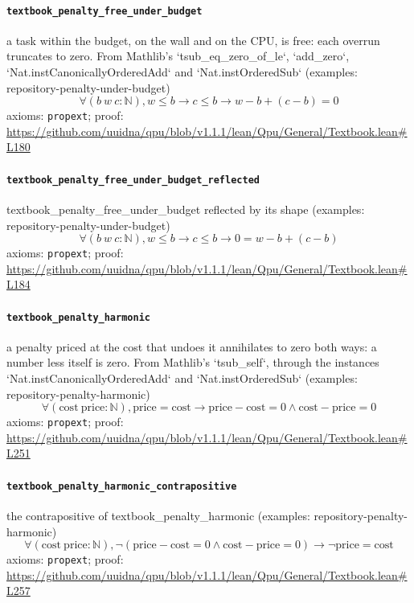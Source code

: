 \documentclass[11pt]{article}
\begin{document}
\paragraph{\texttt{textbook\_penalty\_free\_under\_budget}}
a task within the budget, on the wall and on the CPU, is free: each overrun truncates to zero. From Mathlib's `tsub\_eq\_zero\_of\_le`, `add\_zero`, `Nat.instCanonicallyOrderedAdd` and `Nat.instOrderedSub` (examples: repository-penalty-under-budget)
\[ \forall (b\ w\ c : \mathbb{N}), w \le b \to c \le b \to w - b + (c - b) = 0 \]
\noindent axioms: \texttt{propext}; proof: \url{https://github.com/uuidna/qpu/blob/v1.1.1/lean/Qpu/General/Textbook.lean\#L180}

\paragraph{\texttt{textbook\_penalty\_free\_under\_budget\_reflected}}
textbook\_penalty\_free\_under\_budget reflected by its shape (examples: repository-penalty-under-budget)
\[ \forall (b\ w\ c : \mathbb{N}), w \le b \to c \le b \to 0 = w - b + (c - b) \]
\noindent axioms: \texttt{propext}; proof: \url{https://github.com/uuidna/qpu/blob/v1.1.1/lean/Qpu/General/Textbook.lean\#L184}

\paragraph{\texttt{textbook\_penalty\_harmonic}}
a penalty priced at the cost that undoes it annihilates to zero both ways: a number less itself is zero. From Mathlib's `tsub\_self`, through the instances `Nat.instCanonicallyOrderedAdd` and `Nat.instOrderedSub` (examples: repository-penalty-harmonic)
\[ \forall (\mathrm{cost}\ \mathrm{price} : \mathbb{N}), \mathrm{price} = \mathrm{cost} \to \mathrm{price} - \mathrm{cost} = 0 \land \mathrm{cost} - \mathrm{price} = 0 \]
\noindent axioms: \texttt{propext}; proof: \url{https://github.com/uuidna/qpu/blob/v1.1.1/lean/Qpu/General/Textbook.lean\#L251}

\paragraph{\texttt{textbook\_penalty\_harmonic\_contrapositive}}
the contrapositive of textbook\_penalty\_harmonic (examples: repository-penalty-harmonic)
\[ \forall (\mathrm{cost}\ \mathrm{price} : \mathbb{N}), \neg (\mathrm{price} - \mathrm{cost} = 0 \land \mathrm{cost} - \mathrm{price} = 0) \to \neg \mathrm{price} = \mathrm{cost} \]
\noindent axioms: \texttt{propext}; proof: \url{https://github.com/uuidna/qpu/blob/v1.1.1/lean/Qpu/General/Textbook.lean\#L257}
\end{document}
